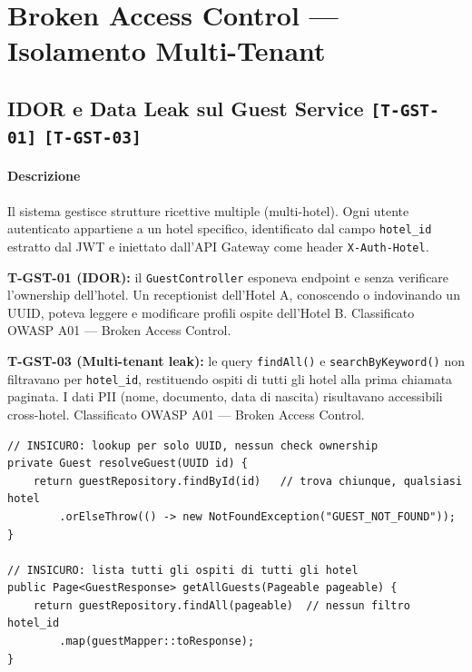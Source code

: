 ﻿\documentclass[a4paper,12pt]{report}
\newcommand{\threat}[1]{\texttt{\small\textcolor{vulnred}{[#1]}}}
\begin{document}
\section{Broken Access Control --- Isolamento Multi-Tenant}

\subsection{IDOR e Data Leak sul Guest Service \threat{T-GST-01} \threat{T-GST-03}}

\paragraph{Descrizione}
Il sistema gestisce strutture ricettive multiple (multi-hotel). Ogni utente autenticato
appartiene a un hotel specifico, identificato dal campo \texttt{hotel\_id} estratto dal JWT
e iniettato dall'API Gateway come header \texttt{X-Auth-Hotel}.

\textbf{T-GST-01 (IDOR):} il \texttt{GuestController} esponeva endpoint
 e  senza verificare
l'ownership dell'hotel. Un receptionist dell'Hotel A, conoscendo o indovinando un UUID,
poteva leggere e modificare profili ospite dell'Hotel B. Classificato OWASP A01 ---
Broken Access Control.

\textbf{T-GST-03 (Multi-tenant leak):} le query \texttt{findAll()} e \texttt{searchByKeyword()}
non filtravano per \texttt{hotel\_id}, restituendo ospiti di tutti gli hotel alla prima
chiamata paginata. I dati PII (nome, documento, data di nascita) risultavano accessibili
cross-hotel. Classificato OWASP A01 --- Broken Access Control.

\begin{insecurebox}[title={Codice Vulnerabile --- GuestServiceImpl.java (baseline)}]
\begin{lstlisting}[style=java]
// INSICURO: lookup per solo UUID, nessun check ownership
private Guest resolveGuest(UUID id) {
    return guestRepository.findById(id)   // trova chiunque, qualsiasi hotel
        .orElseThrow(() -> new NotFoundException("GUEST_NOT_FOUND"));
}

// INSICURO: lista tutti gli ospiti di tutti gli hotel
public Page<GuestResponse> getAllGuests(Pageable pageable) {
    return guestRepository.findAll(pageable)  // nessun filtro hotel_id
        .map(guestMapper::toResponse);
}
\end{lstlisting}
\end{insecurebox}
\end{document}
